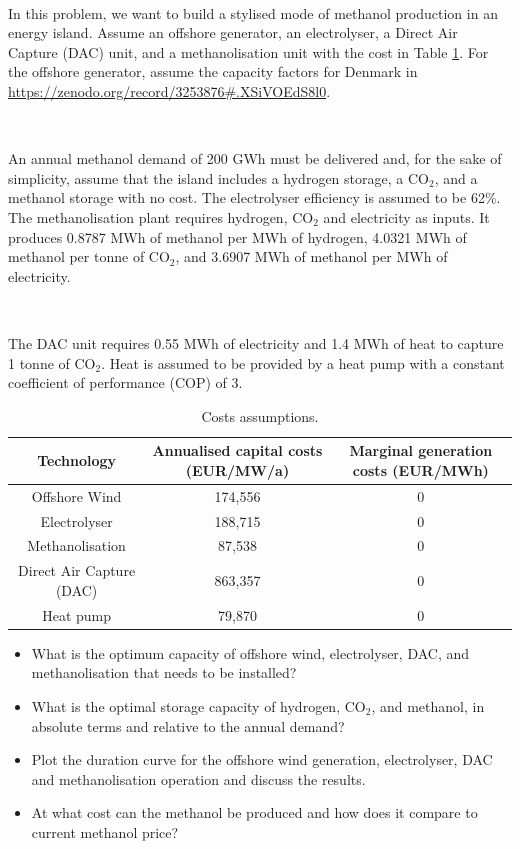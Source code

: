 \documentclass[10pt]{article}
\newenvironment{problem}[2][Problem]{\begin{trivlist}
\item[\hskip \labelsep {\bfseries #1}\hskip \labelsep {\bfseries #2.}]}{\end{trivlist}}
\begin{document}
\

\begin{problem}{12.2}

In this problem, we want to build a stylised mode of methanol production in an energy island. Assume an offshore generator, an electrolyser, a Direct Air Capture (DAC) unit, and a methanolisation unit with the cost in Table \ref{tab_cost}. For the offshore generator, assume the capacity factors for Denmark in \url{https://zenodo.org/record/3253876#.XSiVOEdS8l0}.

\

An annual methanol demand of 200 GWh must be delivered and, for the sake of simplicity, assume that the island includes a hydrogen storage, a CO$_2$, and a methanol storage with no cost. The electrolyser efficiency is assumed to be 62\%. The methanolisation plant requires hydrogen, CO$_2$ and electricity as inputs. It produces 0.8787 MWh of methanol per MWh of hydrogen, 4.0321 MWh of methanol per tonne of CO$_2$, and 3.6907 MWh of methanol per MWh of electricity. 

\

The DAC unit requires  0.55 MWh of electricity and 1.4 MWh of heat to capture 1 tonne of CO$_2$. Heat is assumed to be provided by a heat pump with a constant coefficient of performance (COP) of 3.



\begin{table}[h]
    \centering
    \begin{tabular}{ccc}
    \hline
        Technology & Annualised capital costs (EUR/MW/a) & Marginal generation costs (EUR/MWh) \\
    \hline
    Offshore Wind &  174,556 & 0 \\
    Electrolyser & 188,715 & 0 \\
    Methanolisation & 87,538 & 0 \\
    Direct Air Capture (DAC) & 863,357 & 0 \\
    Heat pump & 79,870 & 0 \\
    \hline
    \end{tabular}
    \caption{Costs assumptions.}
    \label{tab_cost}
\end{table}

\begin{itemize}
\item[a)] What is the optimum capacity of offshore wind, electrolyser, DAC, and methanolisation that needs to be installed?
\item[b)] What is the optimal storage capacity of hydrogen, CO$_2$, and methanol, in absolute terms and relative to the annual demand?
\item[c)] Plot the duration curve for the offshore wind generation, electrolyser, DAC and methanolisation operation and discuss the results.
\item[d)] At what cost can the methanol be produced and how does it compare to current methanol price?

\end{itemize}


\end{problem}



\end{document}
